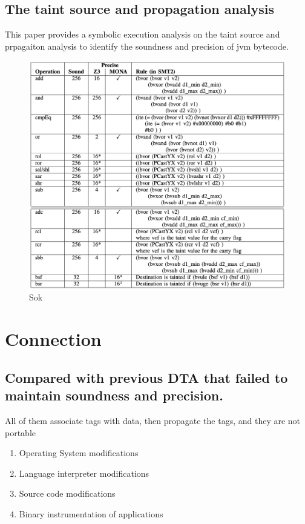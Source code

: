 \documentclass[conference]{IEEEtran}
\begin{document}
\subsection{The taint source and propagation analysis}
This paper \cite{b12} provides a symbolic execution analysis on the taint source and prpagaiton analysis to identify the soundness and precision of jvm bytecode.
\begin{figure}[htbp]
    \centering
    \includegraphics[width=\columnwidth]{./z3.png}
    \caption{Sok}
\end{figure}

\section{Connection}
\subsection{Compared with previous DTA that failed to maintain soundness and precision.}
All of them associate tags with data, then propagate the tags, and they are not portable
\begin{enumerate}
    \item Operating System modifications
    \item Language interpreter modifications
    \item Source code modifications
    \item Binary instrumentation of applications
\end{enumerate}
\end{document}
